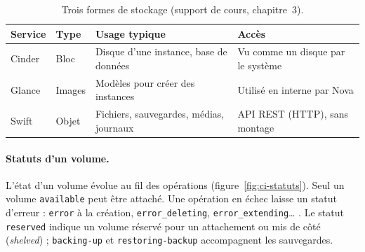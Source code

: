 \begin{table}[!ht]
\centering
\renewcommand{\arraystretch}{1.3}
\begin{tabular}{@{}>{\raggedright\arraybackslash}p{2.0cm}>{\raggedright\arraybackslash}p{3.0cm}>{\raggedright\arraybackslash}p{5.6cm}>{\raggedright\arraybackslash}p{4.6cm}@{}}
\toprule
\textbf{Service} & \textbf{Type} & \textbf{Usage typique} & \textbf{Accès} \\
\midrule
Cinder & Bloc & Disque d'une instance, base de données & Vu comme un disque par le système \\
Glance & Images & Modèles pour créer des instances & Utilisé en interne par Nova \\
Swift & Objet & Fichiers, sauvegardes, médias, journaux & API REST (HTTP), sans montage \\
\bottomrule
\end{tabular}
\caption{Trois formes de stockage (support de cours, chapitre~3).}
\label{tab:ci-stockages}
\end{table}

\paragraph{Statuts d'un volume.} L'état d'un volume évolue au fil des opérations (figure~\ref{fig:ci-statuts}). Seul un volume
\texttt{available} peut être attaché. Une opération en échec laisse un statut d'erreur :
\texttt{error} à la création, \texttt{error\_\allowbreak deleting}, \texttt{error\_\allowbreak extending}\dots{}
\parencite{api-block-storage}. Le statut \texttt{reserved} indique un volume réservé pour un attachement ou mis de côté
(\emph{shelved}) ; \texttt{backing-up} et \texttt{restoring-backup} accompagnent les sauvegardes.

